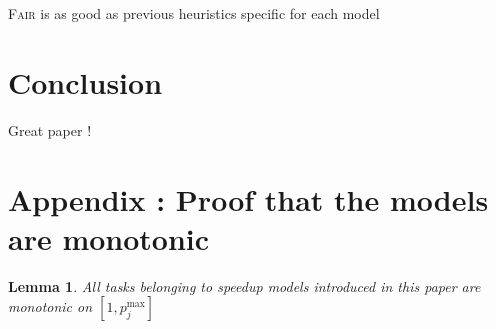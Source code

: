 \documentclass{article}
\newtheorem{lemma}{Lemma}
\newcommand\fair{\textsc{Fair}\xspace}
\begin{document}
\fair is as good as previous heuristics specific for each model
\section{Conclusion}
\label{sec.conclusion}

Great paper !


\appendix
\newpage

\section{Appendix : Proof that the models are monotonic}
\label{ap.detailedproof}

\begin{lemma}
All tasks belonging to speedup models introduced in this paper are monotonic on $[1, p_j^{\max}]$
\end{lemma}
\end{document}
